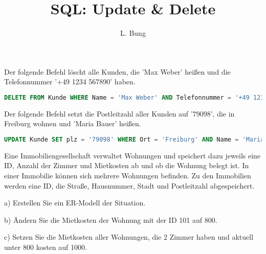 \documentclass[11pt, a4paper, oneside]{article}
\begin{document}
	\author{L. Bung}
	\title{SQL: Update \& Delete}
	\subject{SAE}
	\maketitle
	
	
	Der folgende Befehl löscht alle Kunden, die 'Max Weber' heißen und die Telefonnummer '+49 1234 567890' haben.
	
	\begin{lstlisting}[language=sql]
DELETE FROM Kunde WHERE Name = 'Max Weber' AND Telefonnummer = '+49 1234 567890';
	\end{lstlisting}
	
	
	Der folgende Befehl setzt die Postleitzahl aller Kunden auf '79098', die in Freiburg wohnen und 'Maria Bauer' heißen.
	\begin{lstlisting}[language=sql]
UPDATE Kunde SET plz = '79098' WHERE Ort = 'Freiburg' AND Name = 'Maria Bauer';
	\end{lstlisting}
	
	\pagebreak
	
	
	Eine Immobiliengesellschaft verwaltet Wohnungen und speichert dazu jeweils eine ID, Anzahl der Zimmer und Mietkosten ab und ob die Wohnung belegt ist.
	In einer Immobilie können sich mehrere Wohnungen befinden.
	Zu den Immobilien werden eine ID, die Straße, Hausnummer, Stadt und Postleitzahl abgespeichert.
	
	a) Erstellen Sie ein ER-Modell der Situation.
	
	\boxarea[7cm]
	
	b) Ändern Sie die Mietkosten der Wohnung mit der ID 101 auf 800.
	
	\lines[2cm]
	
	c) Setzen Sie die Mietkosten aller Wohnungen, die 2 Zimmer haben und aktuell unter 800 kosten auf 1000.
	
\end{document}
